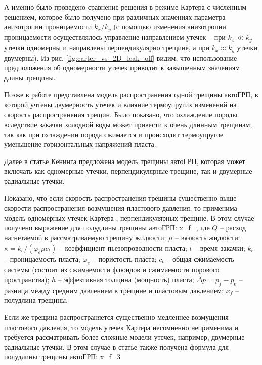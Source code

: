А именно было проведено сравнение решения в режиме Картера с численным решением, которое было получено при различных значениях параметра анизотропии проницаемости $k_x/k_y$ (с помощью изменения анизотропии проницаемости осуществлялось управление направлением утечек -- при $k_x\ll k_y$ утечки одномерны и направлены перпендикулярно трещине, а при $k_x\approx k_y$ утечки двумерны).
Из рис. \ref{fig:carter_vs_2D_leak_off} видим, что использование предположения об одномерности утечек приводит к завышенным значениям длины трещины.

Позже в работе \cite{perkins_gonzalez} представлена модель распространения одной трещины автоГРП, в которой учтены двумерность утечек и влияние термоупругих изменений на скорость распространения трещин.
Было показано, что охлаждение породы вследствие закачки холодной воды может привести к очень длинным трещинам, так как при охлаждении порода сжимается и происходит термоупругое уменьшение горизонтальных напряжений пласта.

Далее в статье Кёнинга \cite{koning} предложена модель трещины автоГРП, которая может включать как одномерные утечки, перпендикулярные трещине, так и двумерные радиальные утечки.

Показано, что если скорость распространения трещины существенно выше скорости распространения возмущения пластового давления, то применима модель одномерных утечек Картера \cite{karter}, перпендикулярных трещине.
В этом случае получено выражение для полудлины трещины автоГРП:
\beq\label{Koning1}
x_{\!f}=,
\eeq
где $Q$ -- расход нагнетаемой в рассматриваемую трещину жидкости;
$\mu$ -- вязкость жидкости;
$\kappa=k_e/(\varphi_e\mu c_t)$ -- коэффициент пьезопроводности пласта;
$t$ -- время закачки;
$k_e$ -- проницаемость пласта;
$\varphi_e$ -- пористость пласта;
$c_t$ -- общая сжимаемость системы (состоит из сжимаемости флюидов и сжимаемости порового пространства);
$h$ -- эффективная толщина (мощность) пласта;
$\Delta p=p_{\!f}-p_e$ -- разница между средним давлением в трещине и пластовым давлением; $x_f$ -- полудлина трещины.

Если же трещина распространяется существенно медленнее возмущения пластового давления, то модель утечек Картера несомненно неприменима и требуется рассматривать более сложные модели утечек, например, двумерные радиальные утечки.
В этом случае в статье \cite{koning} также получена формула для полудлины трещины автоГРП:
\beq\label{Koning2}
x_{\!f}=3
\eeq

